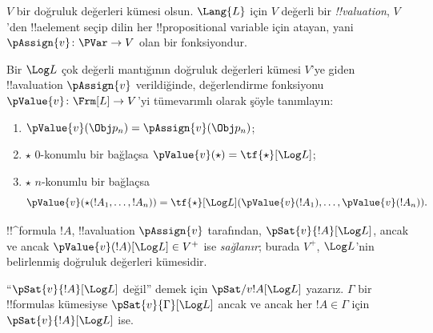 



\begin{defn}[!!^{valuation}s] 
$V$ bir doğruluk değerleri kümesi olsun. $\Lang{L}$ için $V$ değerli bir
\emph{!!{valuation}}, $V$'den !!a{element} seçip dilin her
!!{propositional variable} için atayan, yani
$\pAssign{v}\colon\PVar\to V$ olan bir fonksiyondur.
\end{defn}

\begin{defn}
  Bir $\Log L$ çok değerli mantığının doğruluk değerleri kümesi $V$'ye giden
  !!a{valuation} $\pAssign{v}$ verildiğinde, değerlendirme fonksiyonu
  $\pValue{v}\colon\Frm[L]\to V$'yi tümevarımlı olarak şöyle tanımlayın:
  \begin{enumerate}
    \item $\pValue{v}(\Obj p_n) = \pAssign{v}(\Obj p_n)$; 
    \item $\star$ $0$-konumlu bir bağlaçsa
    $\pValue{v}(\star)=\tf{\star}[\Log L]$;
    \item $\star$ $n$-konumlu bir bağlaçsa
    \[
      \pValue{v}(\star(!A_1, \dots, !A_n)) = \tf{\star}[\Log L]
      (\pValue{v}(!A_1), \dots, \pValue{v}(!A_n)).
    \]
  \end{enumerate}
\end{defn}

\begin{defn}[Sağlama]
 !!^{formula} $!A$, !!a{valuation}
  $\pAssign{v}$ tarafından, $\pSat{v}{!A}[\Log L]$, ancak ve ancak
  $\pValue{v}(!A)[\Log L]\in V^+$ ise \emph{sağlanır}; burada $V^+$,
  $\Log L$'nin belirlenmiş doğruluk değerleri kümesidir.
  
  ``$\pSat{v}{!A}[\Log L]$ değil'' demek için
  $\pSat/{v}{!A}[\Log L]$ yazarız. $\Gamma$ bir !!{formula}s kümesiyse
  $\pSat{v}{\Gamma}[\Log L]$ ancak ve ancak her $!A\in\Gamma$ için
  $\pSat{v}{!A}[\Log L]$ ise.
\end{defn}

